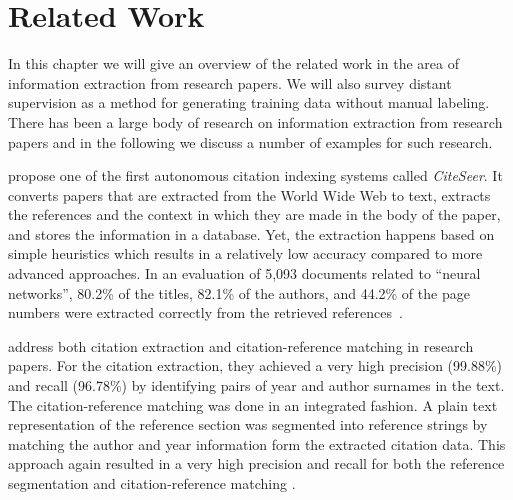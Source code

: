\chapter{Related Work}\label{cha:related-work}
In this chapter we will give an overview of the related work in the area of information extraction from research papers.
We will also survey \gls{distant supervision} as a method for generating training data without manual labeling.\\

There has been a large body of research on information extraction from research papers and in the following we discuss a number of examples for such research.

\citet{giles1998citeseer} propose one of the first autonomous citation indexing systems called \emph{CiteSeer}.
It converts papers that are extracted from the World Wide Web to text, extracts the references and the context in which they are made in the body of the paper, and stores the information in a database.
Yet, the extraction happens based on simple heuristics which results in a relatively low accuracy compared to more advanced approaches.
In an evaluation of 5,093 documents related to ``neural networks'', 80.2\% of the titles, 82.1\% of the authors, and 44.2\% of the page numbers were extracted correctly from the retrieved references~\cite{giles1998citeseer}.


\citet{powley2007evidence} address both citation extraction and citation-reference matching in research papers.
For the citation extraction, they achieved a very high precision (99.88\%) and recall (96.78\%) by identifying pairs of year and author surnames in the text.
The citation-reference matching was done in an integrated fashion.
A plain text representation of the reference section was segmented into reference strings by matching the author and year information form the extracted citation data.
This approach again resulted in a very high precision and recall for both the reference segmentation and citation-reference matching \citep{powley2007evidence}.

